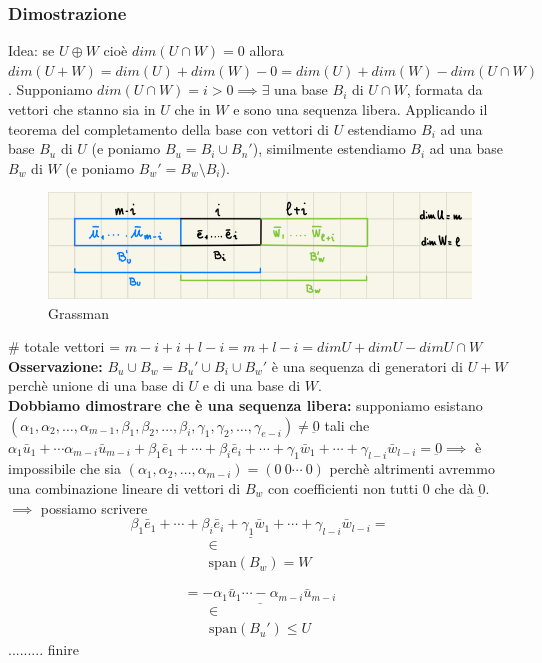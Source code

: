 \documentclass{article}
\newcommand{\s}[2]{#1_1, #1_2, \ldots, #1_{#2}}
\newcommand{\ah}{\alpha}
\newcommand{\bh}{\beta}
\newcommand{\ch}{\gamma}
\begin{document}
\subsubsection{Dimostrazione}
Idea: se $U\oplus W$ cioè $dim (U\cap W) = 0$ allora $dim (U+W) = dim (U) + dim
    (W) - 0 = dim (U) + dim (W) - dim (U\cap W)$. Supponiamo $dim (U\cap W) = i > 0
    \implies \exists$ una base $B_i$ di $U\cap W$, formata da vettori che stanno
sia in $U$ che in $W$ e sono una sequenza libera. Applicando il teorema del
completamento della base con vettori di $U$ estendiamo $B_i$ ad una base $B_u$
di $U$ (e poniamo $B_u = B_i\cup B_n'$), similmente estendiamo $B_i$ ad una
base $B_w$ di $W$ (e poniamo $B_w' = B_w \setminus B_i$).

\begin{figure}[ht]
    \centering
    \includegraphics[width=0.7\linewidth]{grassman.png}
    \caption{Grassman}
    \label{fig:grassman}
\end{figure}

\# totale vettori = $m-i+i+l-i = m+l-i = dim U + dim U - dim U\cap W$ \\
\textbf{Osservazione:} $B_u\cup B_w = B_u'\cup B_i\cup B_w'$ è una sequenza di generatori di $U+W$ perchè unione di una base di $U$ e di una base di $W$.\\
\textbf{Dobbiamo dimostrare che è una sequenza libera:} supponiamo esistano $ (\s{\ah}{m-1}, \s{\bh}{i}, \s{\ch}{e-i})\ne\underbar{0}$ tali che
$\ah_1\bar{u}_1+\cdots\ah_{m-i}\bar{u}_{m-i}+\bh_1\bar{e}_1+\cdots+\bh_i\bar{e}_i+\cdots+\ch_1\bar{w}_1+\cdots+\ch_{l-i}\bar{w}_{l-i} = \underbar{0} \implies$ è impossibile che sia $(\s{\ah}{m-i}) = (0\ 0\cdots\ 0)$ perchè altrimenti avremmo una combinazione lineare di vettori di $B_w$ con coefficienti non tutti $0$ che dà $\underbar{0}$.
$\implies$ possiamo scrivere
\[
    \underline{\bh_1\bar{e}_1+\cdots+\bh_i\bar{e}_i+\ch_1\bar{w}_1+\cdots+\ch_{l-i}\bar{w}_{l-i}} =
\]
\[
    \substack{\in \\ \mathrm{span}(B_w) = W}
\]

\[
    \underline{= -\ah_1\bar{u}_1\cdots-\ah_{m-i}\bar{u}_{m-i}}
\]
\[
    \substack{\in \\ \mathrm{span}(B_u') \leq U}
\]
......... finire
\end{document}
